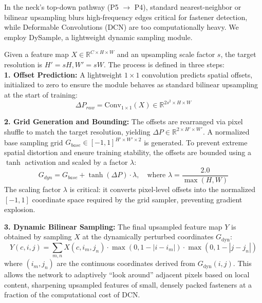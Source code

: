 In the neck's top-down pathway (P5 $\rightarrow$ P4), standard nearest-neighbor or bilinear upsampling blurs high-frequency edges critical for fastener detection, while Deformable Convolutions (DCN) are too computationally heavy. We employ DySample, a lightweight dynamic sampling module.

Given a feature map $X \in \mathbb{R}^{C \times H \times W}$ and an upsampling scale factor $s$, the target resolution is $H' = sH, W' = sW$. The process is defined in three steps:\\

\textbf{1. Offset Prediction:} A lightweight $1 \times 1$ convolution predicts spatial offsets, initialized to zero to ensure the module behaves as standard bilinear upsampling at the start of training:
\begin{equation}
    \Delta P_{raw} = \text{Conv}_{1 \times 1}(X) \in \mathbb{R}^{2s^2 \times H \times W}
\end{equation}

\textbf{2. Grid Generation and Bounding:} The offsets are rearranged via pixel shuffle to match the target resolution, yielding $\Delta P \in \mathbb{R}^{2 \times H' \times W'}$. A normalized base sampling grid $G_{base} \in [-1, 1]^{H' \times W' \times 2}$ is generated. To prevent extreme spatial distortion and ensure training stability, the offsets are bounded using a $\tanh$ activation and scaled by a factor $\lambda$:
\begin{equation}
    G_{dyn} = G_{base} + \tanh(\Delta P) \cdot \lambda, \quad \text{where } \lambda = \frac{2.0}{\max(H, W)}
\end{equation}
The scaling factor $\lambda$ is critical: it converts pixel-level offsets into the normalized $[-1, 1]$ coordinate space required by the grid sampler, preventing gradient explosion.

\textbf{3. Dynamic Bilinear Sampling:} The final upsampled feature map $Y$ is obtained by sampling $X$ at the dynamically perturbed coordinates $G_{\mathrm{dyn}}$:
\begin{equation}
    Y(c, i, j) = \sum_{m,n} X(c, i_m, j_n) \cdot \max(0, 1 - |i - i_m|) \cdot \max(0, 1 - |j - j_n|)
\end{equation}
where $(i_m, j_n)$ are the continuous coordinates derived from $G_{\mathrm{dyn}}(i, j)$. This allows the network to adaptively ``look around'' adjacent pixels based on local content, sharpening upsampled features of small, densely packed fasteners at a fraction of the computational cost of DCN.

